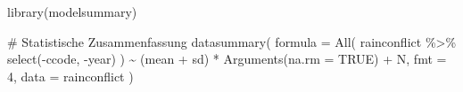 \documentclass[
  a4paper,
  DIV=11,
  oneside]{scrreprt}
\newenvironment{Shaded}{\begin{snugshade}}{\end{snugshade}}
\newcommand{\AttributeTok}[1]{\textcolor[rgb]{0.40,0.45,0.13}{#1}}
\newcommand{\CommentTok}[1]{\textcolor[rgb]{0.37,0.37,0.37}{#1}}
\newcommand{\ConstantTok}[1]{\textcolor[rgb]{0.56,0.35,0.01}{#1}}
\newcommand{\DecValTok}[1]{\textcolor[rgb]{0.68,0.00,0.00}{#1}}
\newcommand{\FunctionTok}[1]{\textcolor[rgb]{0.28,0.35,0.67}{#1}}
\newcommand{\NormalTok}[1]{\textcolor[rgb]{0.00,0.23,0.31}{#1}}
\newcommand{\SpecialCharTok}[1]{\textcolor[rgb]{0.37,0.37,0.37}{#1}}
\begin{document}
\begin{Shaded}
\begin{Highlighting}[]
\FunctionTok{library}\NormalTok{(modelsummary)}

\CommentTok{\# Statistische Zusammenfassung}
\FunctionTok{datasummary}\NormalTok{(}
  \AttributeTok{formula =} \FunctionTok{All}\NormalTok{( rainconflict }\SpecialCharTok{\%\textgreater{}\%} \FunctionTok{select}\NormalTok{(}\SpecialCharTok{{-}}\NormalTok{ccode, }\SpecialCharTok{{-}}\NormalTok{year) )   }
    \SpecialCharTok{\textasciitilde{}}\NormalTok{ (mean }\SpecialCharTok{+}\NormalTok{ sd) }\SpecialCharTok{*} \FunctionTok{Arguments}\NormalTok{(}\AttributeTok{na.rm =} \ConstantTok{TRUE}\NormalTok{) }
    \SpecialCharTok{+}\NormalTok{ N, }
  \AttributeTok{fmt =} \DecValTok{4}\NormalTok{,}
  \AttributeTok{data =}\NormalTok{ rainconflict }
\NormalTok{) }
\end{Highlighting}
\end{Shaded}
\end{document}
